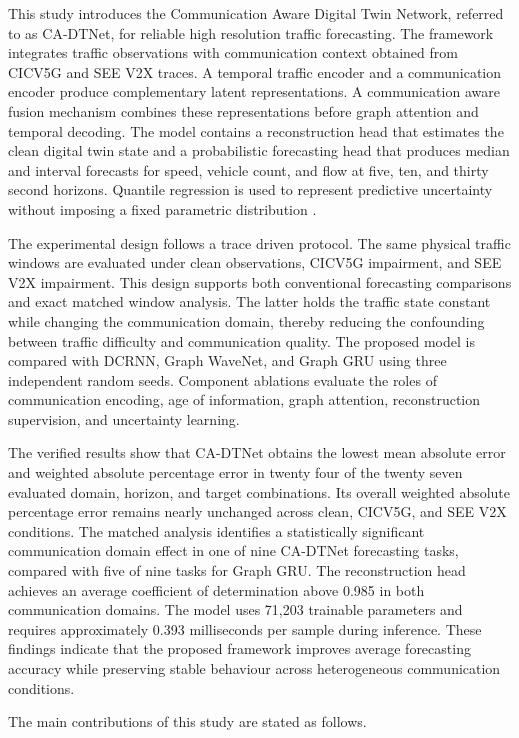 \documentclass[pdflatex,sn-mathphys-num]{sn-jnl}%
\theoremstyle{thmstyleone}%
\theoremstyle{thmstyletwo}%
\theoremstyle{thmstylethree}%
\begin{document}
This study introduces the Communication Aware Digital Twin Network, referred to as CA-DTNet, for reliable high resolution traffic forecasting. The framework integrates traffic observations with communication context obtained from CICV5G and SEE V2X traces. A temporal traffic encoder and a communication encoder produce complementary latent representations. A communication aware fusion mechanism combines these representations before graph attention and temporal decoding. The model contains a reconstruction head that estimates the clean digital twin state and a probabilistic forecasting head that produces median and interval forecasts for speed, vehicle count, and flow at five, ten, and thirty second horizons. Quantile regression is used to represent predictive uncertainty without imposing a fixed parametric distribution \cite{koenker1978quantile}.

The experimental design follows a trace driven protocol. The same physical traffic windows are evaluated under clean observations, CICV5G impairment, and SEE V2X impairment. This design supports both conventional forecasting comparisons and exact matched window analysis. The latter holds the traffic state constant while changing the communication domain, thereby reducing the confounding between traffic difficulty and communication quality. The proposed model is compared with DCRNN, Graph WaveNet, and Graph GRU using three independent random seeds. Component ablations evaluate the roles of communication encoding, age of information, graph attention, reconstruction supervision, and uncertainty learning.

The verified results show that CA-DTNet obtains the lowest mean absolute error and weighted absolute percentage error in twenty four of the twenty seven evaluated domain, horizon, and target combinations. Its overall weighted absolute percentage error remains nearly unchanged across clean, CICV5G, and SEE V2X conditions. The matched analysis identifies a statistically significant communication domain effect in one of nine CA-DTNet forecasting tasks, compared with five of nine tasks for Graph GRU. The reconstruction head achieves an average coefficient of determination above 0.985 in both communication domains. The model uses 71,203 trainable parameters and requires approximately 0.393 milliseconds per sample during inference. These findings indicate that the proposed framework improves average forecasting accuracy while preserving stable behaviour across heterogeneous communication conditions.

The main contributions of this study are stated as follows.
\end{document}
